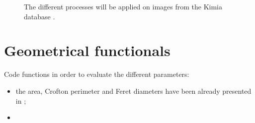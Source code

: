 \vspace*{-10pt}

\begin{figure}[H]
\centering\caption[Kimia image database.]{The different processes will be applied on images from the Kimia database \cite{KimiaDB,Sharvit1998}.}%
\hfill
{}\hfill
{}%
\vspace*{-8pt}
\end{figure}


\section{Geometrical functionals}
\vspace*{-10pt}
\begin{qbox}
Code functions in order to evaluate the different parameters:\vspace*{-8pt}
  \begin{itemize}
  \item the area, Crofton perimeter and Feret diameters have been already presented in ;
	\item {}  
 \end{itemize}
\end{qbox}

